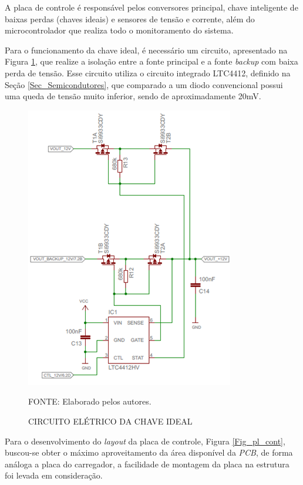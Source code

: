 \documentclass[
	12pt,				%
	openright,			%
	oneside,			%
	a4paper,			%
	english,			%
	french,				%
	spanish,			%
	brazil,				%
	oldfontcommands
	]{abntex2}
\begin{document}
	A placa de controle é responsável pelos conversores principal, chave inteligente de baixas perdas (chaves ideais) e sensores de tensão e corrente, além do microcontrolador que realiza todo o monitoramento do sistema.
	
	Para o funcionamento da chave ideal, é necessário um circuito, apresentado na Figura \ref{Fig_chave}, que realize a isolação entre a fonte principal e a fonte \textit{backup} com baixa perda de tensão. Esse circuito utiliza o circuito integrado LTC4412, definido na Seção \ref{Sec_Semicondutores}, que comparado a um diodo convencional possui uma queda de tensão muito inferior, sendo de aproximadamente 20mV.
	
	\begin{figure}[th]
		\caption{CIRCUITO ELÉTRICO DA CHAVE IDEAL}
		\label{Fig_chave}
		\centering
		\includegraphics[width=0.5\linewidth]{./figs/chave_id}
			
		\begin{small}
			FONTE: Elaborado pelos autores.
		\end{small}
	\end{figure}

	Para o desenvolvimento do \textit{layout} da placa de controle, Figura \ref{Fig_pl_cont}, buscou-se obter o máximo aproveitamento da área disponível da \textit{PCB}, de forma análoga a placa do carregador, a facilidade de montagem da placa na estrutura foi levada em consideração.
	
\end{document}
